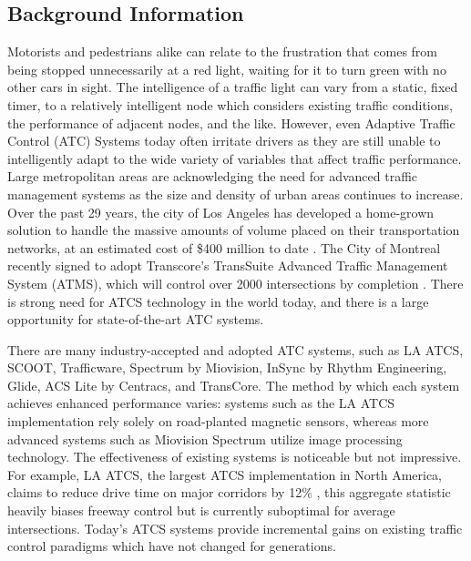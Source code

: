 \documentclass[a4paper,11pt]{report}
\begin{document}
\begin{multicols}{2}
\section{Background Information}
Motorists and pedestrians alike can relate to the frustration that comes from being stopped unnecessarily at a red light, waiting for it to turn green with no other cars in sight.
The intelligence of a traffic light can vary from a static, fixed timer, to a relatively intelligent node which considers existing traffic conditions, the performance of adjacent nodes, and the like.
However, even Adaptive Traffic Control (ATC) Systems today often irritate drivers as they are still unable to intelligently adapt to the wide variety of variables that affect traffic performance.\\

Large metropolitan areas are acknowledging the need for advanced traffic management systems as the size and density of urban areas continues to increase.
Over the past 29 years, the city of Los Angeles has developed a home-grown solution to handle the massive amounts of volume placed on their transportation networks, at an estimated cost of \$400 million to date \cite{la-atcs-article}.
The City of Montreal recently signed to adopt Transcore's TransSuite Advanced Traffic Management System (ATMS), which will control over 2000 intersections by completion \cite{montreal-transcore}.
There is strong need for ATCS technology in the world today, and there is a large opportunity for state-of-the-art ATC systems.

There are many industry-accepted and adopted ATC systems, such as LA ATCS, SCOOT, Trafficware, Spectrum by Miovision, InSync by Rhythm Engineering, Glide, ACS Lite by Centracs, and TransCore.
The method by which each system achieves enhanced performance varies: systems such as the LA ATCS implementation rely solely on road-planted magnetic sensors, whereas more advanced systems such as Miovision Spectrum utilize image processing technology.
The effectiveness of existing systems is noticeable but not impressive.
For example, LA ATCS, the largest ATCS implementation in North America, claims to reduce drive time on major corridors by 12\% \cite{la-atcs-article}, this aggregate statistic heavily biases freeway control but is currently suboptimal for average intersections.
Today's ATCS systems provide incremental gains on existing traffic control paradigms which have not changed for generations.


\end{multicols}
\end{document}
